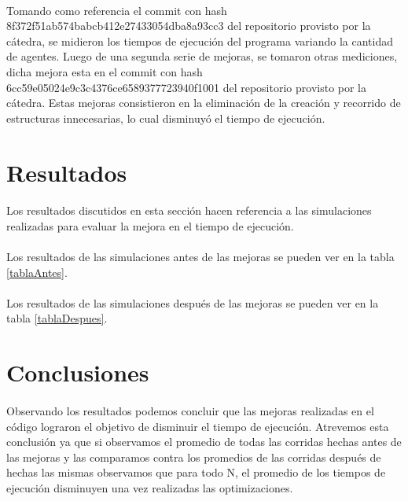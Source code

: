 \documentclass{article}
\begin{document}
\paragraph{}
Tomando como referencia el commit con hash 8f372f51ab574babcb412e27433054dba8a93cc3 del repositorio provisto por la cátedra, se midieron los tiempos de ejecución del programa variando la cantidad de agentes. Luego de una segunda serie de mejoras, se tomaron otras mediciones, dicha mejora esta en el commit con hash 6cc59e05024e9c3c4376ce6589377723940f1001 del repositorio provisto por la cátedra. Estas mejoras consistieron en la eliminación de la creación y recorrido de estructuras innecesarias, lo cual disminuyó el tiempo de ejecución.

\section{Resultados}

\paragraph{}
Los resultados discutidos en esta sección hacen referencia a las simulaciones realizadas para evaluar la mejora en el tiempo de ejecución.

\paragraph{}
Los resultados de las simulaciones antes de las mejoras se pueden ver en la tabla \ref{tablaAntes}.

\paragraph{}
Los resultados de las simulaciones después de las mejoras se pueden ver en la tabla \ref{tablaDespues}.

\section{Conclusiones}

\paragraph{}
Observando los resultados podemos concluir que las mejoras realizadas en el código lograron el objetivo de disminuir el tiempo de ejecución. Atrevemos esta conclusión ya que si observamos el promedio de todas las corridas hechas antes de las mejoras y las comparamos contra los promedios de las corridas después de hechas las mismas observamos que para todo N, el promedio de los tiempos de ejecución disminuyen una vez realizadas las optimizaciones.
\end{document}
